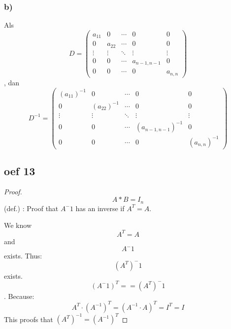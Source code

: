 \documentclass[lineaire_algebra_oplossingen.tex]{subfiles}
\begin{document}
\subsubsection*{b)}
Als
$$ D = \begin{pmatrix}
a_{11} & 0 & \cdots & 0 & 0\\
0 & a_{22} & \cdots & 0 & 0\\
\vdots & \vdots & \ddots & \vdots & \vdots\\
0 & 0 & \cdots & a_{n-1,n-1} & 0 \\
0 & 0 & \cdots & 0 & a_{n,n}
\end{pmatrix}
$$, dan
$$ D^{-1} = \begin{pmatrix}
(a_{11})^{-1} & 0 & \cdots & 0 & 0\\
0 & (a_{22})^{-1} & \cdots & 0 & 0\\
\vdots & \vdots & \ddots & \vdots & \vdots\\
0 & 0 & \cdots & (a_{n-1,n-1})^{-1} & 0 \\
0 & 0 & \cdots & 0 & (a_{n,n})^{-1}
\end{pmatrix}
$$

\subsection{oef 13}

\begin{proof}

\[A*B = I_{n} \] (def.) : Proof that $A^-1$ has an inverse if $ A^T = A $.

We know \[A^T = A \] and \[ A^-1 \] exists.
Thus: \[(A^T)^-1 \] exists.
\[ (A^-1)^T ==  (A^T)^-1 \].
Because:
$$A^T\cdot (A^{-1})^T = (A^{-1}\cdot A)^T = I^T = I$$
This proofs that $(A^T)^{-1} = (A^{-1})^T$
\end{proof}
\end{document}
